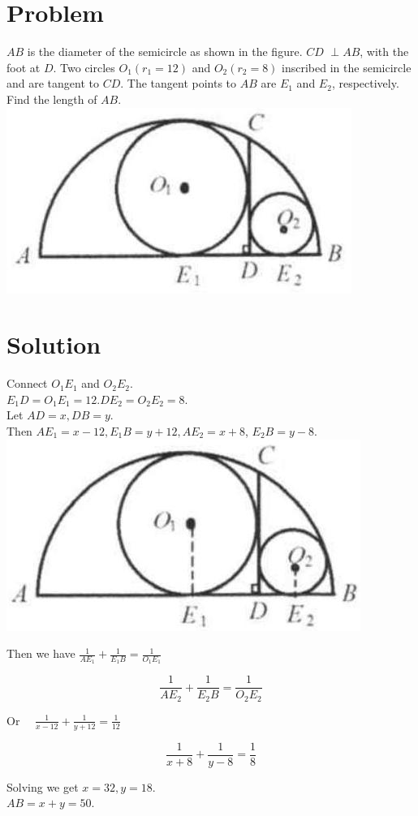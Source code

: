 \documentclass{article}
\begin{document}
\section*{Problem}
\(A B\) is the diameter of the semicircle as shown in the figure. \(C D\) \(\perp A B\), with the foot at \(D\). Two circles \(O_{1}\left(r_{1}=12\right)\) and \(O_{2}\left(r_{2}=8\right)\) inscribed in the semicircle and are tangent to \(C D\). The tangent points to \(A B\) are \(E_{1}\) and \(E_{2}\), respectively. Find the length of \(A B\).\\
\centering
\includegraphics[width=\textwidth]{images/185(3).jpg}

\section*{Solution}
Connect \(O_{1} E_{1}\) and \(O_{2} E_{2}\).\\
\(E_{1} D=O_{1} E_{1}=12 . D E_{2}=O_{2} E_{2}=8\).\\
Let \(A D=x, D B=y\).\\
Then \(A E_{1}=x-12, E_{1} B=y+12, A E_{2}=x+8\), \(E_{2} B=y-8\).\\
\centering
\includegraphics[width=\textwidth]{images/189(1).jpg}

Then we have \(\frac{1}{A E_{1}}+\frac{1}{E_{1} B}=\frac{1}{O_{1} E_{1}}\)

\[
\frac{1}{A E_{2}}+\frac{1}{E_{2} B}=\frac{1}{O_{2} E_{2}}
\]

Or \(\quad \frac{1}{x-12}+\frac{1}{y+12}=\frac{1}{12}\)

\[
\frac{1}{x+8}+\frac{1}{y-8}=\frac{1}{8}
\]

Solving we get \(x=32, y=18\).\\
\(A B=x+y=50\).
\end{document}
